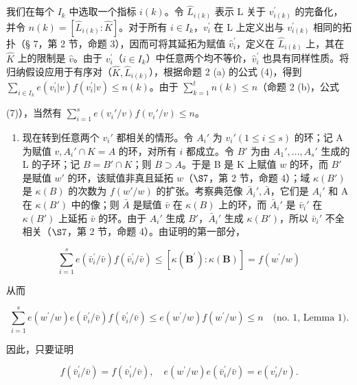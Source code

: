 我们在每个 \(I_{k}\) 中选取一个指标 \(i(k)\)。令 \(\hat{L}_{i(k)}\) 表示 L 关于 \(v_{i(k)}^{\prime}\) 的完备化，并令 \(n(k) = [\hat{L}_{i(k)} : \hat{K}]\)。对于所有 \(i \in I_{k}\)，\(v_{i}^{\prime}\) 在 L 上定义出与 \(v_{i(k)}^{\prime}\) 相同的拓扑（§ 7，第 2 节，命题 3），因而可将其延拓为赋值 \(\hat{v}_{i}^{\prime}\)，定义在 \(\hat{L}_{i(k)}\) 上，其在 \(\hat{K}\) 上的限制是 \(\hat{v}\)。由于 \(v_{i}^{\prime}\)（\(i \in I_{k}\)）中任意两个均不等价，\(\hat{v}_{i}^{\prime}\) 也具有同样性质。将归纳假设应用于有序对（\(\hat{K}, \hat{L}_{i(k)}\)），根据命题 2 (a) 的公式 (4)，得到 \(\sum_{i\in I_k}e(v_i^{\prime}|v)f(v_i^{\prime}|v)\leqslant n(k)\)。由于 \(\sum_{k = 1}^{t}n(k)\leqslant n\)（命题 2 (b)，公式

(7)），当然有 \(\sum_{i=1}^{s} e(v_i'/v) f(v_i'/v) \leqslant n\)。

\begin{enumerate}
\def\labelenumi{(\arabic{enumi})}
\setcounter{enumi}{1}
\tightlist
\item
  现在转到任意两个 \(v_i'\) 都相关的情形。令 \(A_i'\) 为 \(v_i' (1 \leqslant i \leqslant s)\) 的环；记 A 为赋值 \(v, A_i' \cap K = A\) 的环，对所有 \(i\) 都成立。令 \(B'\) 为由 \(A_1', \ldots, A_s'\) 生成的 L 的子环；记 \(B = B' \cap K\)；则 \(B \supset A\)。于是 B 是 K 上赋值 \(w\) 的环，而 \(B'\) 是赋值 \(w'\) 的环，该赋值非真且延拓 \(w\)（\(\S 7\)，第 2 节，命题 4）；域 \(\kappa(B')\) 是 \(\kappa(B)\) 的次数为 \(f(w'/w)\) 的扩张。考察典范像 \(\bar{A}_i', \bar{A}\)，它们是 \(A_i'\) 和 A 在 \(\kappa(B')\) 中的像；则 \(\bar{A}\) 是赋值 \(\bar{v}\) 在 \(\kappa(B)\) 上的环，而 \(\bar{A}_i'\) 是 \(\bar{v}_i'\) 在 \(\kappa(B')\) 上延拓 \(\bar{v}\) 的环。由于 \(A_i'\) 生成 \(B'\)，\(\bar{A}_i'\) 生成 \(\kappa(B')\)，所以 \(\bar{v}_i'\) 不全相关（\(\S 7\)，第 2 节，命题 4）。由证明的第一部分，
\end{enumerate}

\[
\sum_ {i = 1} ^ {s} e \left(\bar {v} _ {i} ^ {\prime} / \bar {v}\right) f \left(\bar {v} _ {i} ^ {\prime} / \bar {v}\right) \leqslant \left[ \kappa \left(\mathbf {B} ^ {\prime}\right): \kappa (\mathbf {B}) \right] = f \left(w ^ {\prime} / w\right)
\]

从而

\[
\sum_ {i = 1} ^ {s} e (w ^ {\prime} / w) e (\bar {v} _ {i} ^ {\prime} / \bar {v}) f (\bar {v} _ {i} ^ {\prime} / \bar {v}) \leqslant e (w ^ {\prime} / w) f (w ^ {\prime} / w) \leqslant n \quad \text {(no. 1, Lemma 1)}.
\]

因此，只要证明

\[
f (\bar {v} _ {i} ^ {\prime} / \bar {v}) = f (\bar {v} _ {i} ^ {\prime} / \bar {v}), \quad e (w ^ {\prime} / w) e (\bar {v} _ {i} ^ {\prime} / \bar {v}) = e (v _ {i} ^ {\prime} / v).\tag{8}
\]

